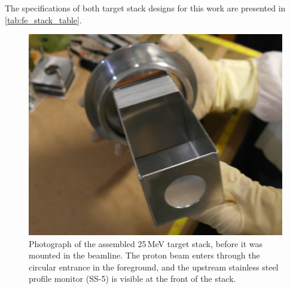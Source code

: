 The specifications of both target stack designs for this work are presented in \autoref{tab:fe_stack_table}.



\begin{figure}
 \centering
 \includegraphics[width=0.5\linewidth]{./figures/SAM_2494.JPG}
 \caption{\label{fig:fe_target_stack}Photograph of the assembled 25\,MeV target stack, before it was mounted in the beamline. The proton beam enters through the circular entrance in the foreground, and the upstream stainless steel profile monitor (SS-5) is visible at the front of the stack.}
\end{figure}

